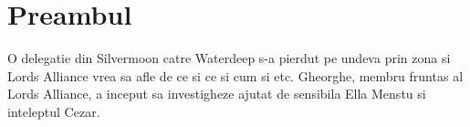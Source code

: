 \documentclass[12pt,twoside]{book}
\begin{document}


\newpage

\tableofcontents

\newpage


\chapter{Preambul}

O delegatie din Silvermoon catre Waterdeep s-a pierdut pe undeva prin zona si Lords Alliance vrea sa afle de ce si ce si cum si etc. 
Gheorghe, membru fruntas al Lords Alliance, a inceput sa investigheze ajutat de sensibila Ella Menstu si inteleptul Cezar.
\end{document}
